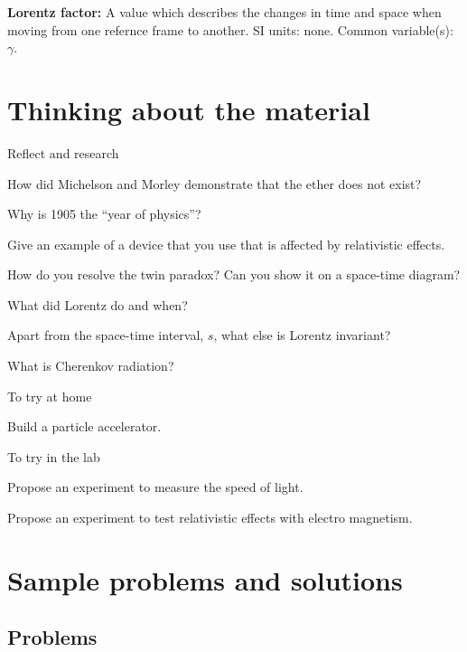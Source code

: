 \begin{definitions}
	\textbf{Lorentz factor:} A value which describes the changes in time and space when moving from one refernce frame to another. SI units: none. Common variable(s): $\gamma$.
\end{definitions}

\newpage
\section{Thinking about the material}

\begin{chapteractivity}{Reflect and research}
	{
	\item How did Michelson and Morley demonstrate that the ether does not exist? 
	\item Why is 1905 the ``year of physics''?
	\item Give an example of a device that you use that is affected by relativistic effects.
	\item How do you resolve the twin paradox? Can you show it on a space-time diagram?
	\item What did Lorentz do and when?
	\item Apart from the space-time interval, $s$, what else is Lorentz invariant?
	\item What is Cherenkov radiation?
	}
\end{chapteractivity}

\begin{chapteractivity}{To try at home}
	{
	\item Build a particle accelerator.
	\item 
	}
\end{chapteractivity}

\begin{chapteractivity}{To try in the lab}
	{
	 \item Propose an experiment to measure the speed of light.
	 \item Propose an experiment to test relativistic effects with electro magnetism.
	}
\end{chapteractivity}

\newpage
\section{Sample problems and solutions}
\subsection{Problems}



